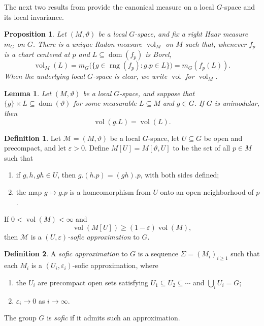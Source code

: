 \documentclass[12pt]{amsart}
\newtheorem{proposition}[proposition]{Proposition}
\newtheorem{lemma}[lemma]{Lemma}
\theoremstyle{definition}
\newtheorem{definition}[definition]{Definition}
\newcommand{\Haar}{m_G}
\newcommand{\vol}{\operatorname{vol}}
\newcommand{\1}{\mathbf 1}
\newcommand{\eps}{\varepsilon}
\newcommand{\dbar}{\overline{\vol}}
\begin{document}
The next two results from \cite{BowenBurton} provide the canonical measure on
a local $G$-space and its local invariance.

\begin{proposition}
Let $(M,\vartheta)$ be a local $G$-space, and fix a right Haar measure $\Haar$
on $G$. There is a unique Radon measure $\vol_M$ on $M$ such that, whenever
$f_p$ is a chart centered at $p$ and $L\subseteq\operatorname{dom}(f_p)$ is
Borel,
\[
 \vol_M(L)=\Haar\bigl(\{g\in\operatorname{rng}(f_p):g.p\in L\}\bigr)
 =\Haar(f_p(L)).
\]
When the underlying local $G$-space is clear, we write $\vol$ for $\vol_M$.
\end{proposition}

\begin{lemma}\label{lmp}
Let $(M,\vartheta)$ be a local $G$-space, and suppose that
$\{g\}\times L\subseteq\operatorname{dom}(\vartheta)$ for some measurable
$L\subseteq M$ and $g\in G$. If $G$ is unimodular, then
\[
 \vol(g.L)=\vol(L).
\]
\end{lemma}

\begin{definition}\label{def:local-sofic-model}
Let $\mathcal M=(M,\vartheta)$ be a local $G$-space, let $U\subseteq G$ be
open and precompact, and let $\eps>0$. Define $M[U]=M[\vartheta,U]$ to be the
set of all $p\in M$ such that
\begin{enumerate}
\item if $g,h,gh\in U$, then $g.(h.p)=(gh).p$, with both sides defined;
\item the map $g\mapsto g.p$ is a homeomorphism from $U$ onto an open
neighborhood of $p$.
\end{enumerate}
If $0<\vol(M)<\infty$ and
\[
 \vol(M[U])\geq(1-\eps)\vol(M),
\]
then $\mathcal M$ is a \emph{$(U,\eps)$-sofic approximation} to $G$.
\end{definition}

\begin{definition}\label{def:sofic-approximation}
A \emph{sofic approximation} to $G$ is a sequence
$\Sigma=(M_i)_{i\geq1}$ such that each $M_i$ is a
$(U_i,\eps_i)$-sofic approximation, where
\begin{enumerate}
\item the $U_i$ are precompact open sets satisfying
$U_1\subseteq U_2\subseteq\cdots$ and $\bigcup_iU_i=G$;
\item $\eps_i\to0$ as $i\to\infty$.
\end{enumerate}
The group $G$ is \emph{sofic} if it admits such an approximation.
\end{definition}
\end{document}
